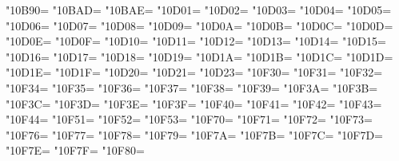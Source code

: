 \XeTeXcharclass"10B90=\KclassArabD
\XeTeXcharclass"10BAD=\KclassArabD
\XeTeXcharclass"10BAE=\KclassArabD
\XeTeXcharclass"10D01=\KclassArabD
\XeTeXcharclass"10D02=\KclassArabD
\XeTeXcharclass"10D03=\KclassArabD
\XeTeXcharclass"10D04=\KclassArabD
\XeTeXcharclass"10D05=\KclassArabD
\XeTeXcharclass"10D06=\KclassArabD
\XeTeXcharclass"10D07=\KclassArabD
\XeTeXcharclass"10D08=\KclassArabD
\XeTeXcharclass"10D09=\KclassArabD
\XeTeXcharclass"10D0A=\KclassArabD
\XeTeXcharclass"10D0B=\KclassArabD
\XeTeXcharclass"10D0C=\KclassArabD
\XeTeXcharclass"10D0D=\KclassArabD
\XeTeXcharclass"10D0E=\KclassArabD
\XeTeXcharclass"10D0F=\KclassArabD
\XeTeXcharclass"10D10=\KclassArabD
\XeTeXcharclass"10D11=\KclassArabD
\XeTeXcharclass"10D12=\KclassArabD
\XeTeXcharclass"10D13=\KclassArabD
\XeTeXcharclass"10D14=\KclassArabD
\XeTeXcharclass"10D15=\KclassArabD
\XeTeXcharclass"10D16=\KclassArabD
\XeTeXcharclass"10D17=\KclassArabD
\XeTeXcharclass"10D18=\KclassArabD
\XeTeXcharclass"10D19=\KclassArabD
\XeTeXcharclass"10D1A=\KclassArabD
\XeTeXcharclass"10D1B=\KclassArabD
\XeTeXcharclass"10D1C=\KclassArabD
\XeTeXcharclass"10D1D=\KclassArabD
\XeTeXcharclass"10D1E=\KclassArabD
\XeTeXcharclass"10D1F=\KclassArabD
\XeTeXcharclass"10D20=\KclassArabD
\XeTeXcharclass"10D21=\KclassArabD
\XeTeXcharclass"10D23=\KclassArabD
\XeTeXcharclass"10F30=\KclassArabD
\XeTeXcharclass"10F31=\KclassArabD
\XeTeXcharclass"10F32=\KclassArabD
\XeTeXcharclass"10F34=\KclassArabD
\XeTeXcharclass"10F35=\KclassArabD
\XeTeXcharclass"10F36=\KclassArabD
\XeTeXcharclass"10F37=\KclassArabD
\XeTeXcharclass"10F38=\KclassArabD
\XeTeXcharclass"10F39=\KclassArabD
\XeTeXcharclass"10F3A=\KclassArabD
\XeTeXcharclass"10F3B=\KclassArabD
\XeTeXcharclass"10F3C=\KclassArabD
\XeTeXcharclass"10F3D=\KclassArabD
\XeTeXcharclass"10F3E=\KclassArabD
\XeTeXcharclass"10F3F=\KclassArabD
\XeTeXcharclass"10F40=\KclassArabD
\XeTeXcharclass"10F41=\KclassArabD
\XeTeXcharclass"10F42=\KclassArabD
\XeTeXcharclass"10F43=\KclassArabD
\XeTeXcharclass"10F44=\KclassArabD
\XeTeXcharclass"10F51=\KclassArabD
\XeTeXcharclass"10F52=\KclassArabD
\XeTeXcharclass"10F53=\KclassArabD
\XeTeXcharclass"10F70=\KclassArabD
\XeTeXcharclass"10F71=\KclassArabD
\XeTeXcharclass"10F72=\KclassArabD
\XeTeXcharclass"10F73=\KclassArabD
\XeTeXcharclass"10F76=\KclassArabD
\XeTeXcharclass"10F77=\KclassArabD
\XeTeXcharclass"10F78=\KclassArabD
\XeTeXcharclass"10F79=\KclassArabD
\XeTeXcharclass"10F7A=\KclassArabD
\XeTeXcharclass"10F7B=\KclassArabD
\XeTeXcharclass"10F7C=\KclassArabD
\XeTeXcharclass"10F7D=\KclassArabD
\XeTeXcharclass"10F7E=\KclassArabD
\XeTeXcharclass"10F7F=\KclassArabD
\XeTeXcharclass"10F80=\KclassArabD

